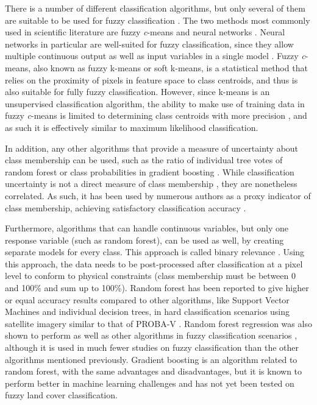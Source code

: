 \documentclass[a4paper,12pt]{scrbook}
\begin{document}
There is a number of different classification algorithms, but only several of them are suitable to be used for fuzzy classification \citep{nath2014methods}. The two methods most commonly used in scientific literature are fuzzy \textit{c}-means and neural networks \citep{zhang2001fullyfuzzy}. Neural networks in particular are well-suited for fuzzy classification, since they allow multiple continuous output as well as input variables in a single model \citep{foody1997fuzzynnet}. Fuzzy \textit{c}-means, also known as fuzzy k-means or soft k-means, is a statistical method that relies on the proximity of pixels in feature space to class centroids, and thus is also suitable for fully fuzzy classification. However, since k-means is an unsupervised classification algorithm, the ability to make use of training data in fuzzy \textit{c}-means is limited to determining class centroids with more precision \citep{hengl2004fuzzycmeans}, and as such it is effectively similar to maximum likelihood classification.

In addition, any other algorithms that provide a measure of uncertainty about class membership can be used, such as the ratio of individual tree votes of random forest \citep{breiman2001random} or class probabilities in gradient boosting \citep{friedman2001gradientboost}. While classification uncertainty is not a direct measure of class membership \citep{sytze2000fuzzyset}, they are nonetheless correlated. As such, it has been used by numerous authors as a proxy indicator of class membership, achieving satisfactory classification accuracy \citep{foody2002accuracy}.

Furthermore, algorithms that can handle continuous variables, but only one response variable (such as random forest), can be used as well, by creating separate models for every class. This approach is called binary relevance \citep{karalas2016br}. Using this approach, the data needs to be post-processed after classification at a pixel level to conform to physical constraints (class membership must be between 0 and 100\% and sum up to 100\%). Random forest has been reported to give higher or equal accuracy results compared to other algorithms, like Support Vector Machines and individual decision trees, in hard classification scenarios using satellite imagery similar to that of PROBA-V \citep{duro2012algorithmcomparison}. Random forest regression was also shown to perform as well as other algorithms in fuzzy classification scenarios \citep{walton2008subpixelrf}, although it is used in much fewer studies on fuzzy classification than the other algorithms mentioned previously. Gradient boosting is an algorithm related to random forest, with the same advantages and disadvantages, but it is known to perform better in machine learning challenges \citep{chen2015higgs} and has not yet been tested on fuzzy land cover classification.
\end{document}
